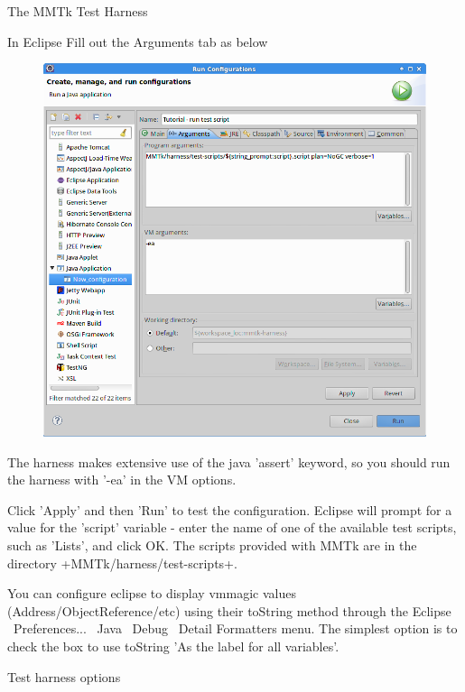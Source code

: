 \begin{chapter}{The MMTk Test Harness}
\begin{section}{In Eclipse}
Fill out the Arguments tab as below 

\begin{figure}[H]
  \centering
  \includegraphics[width=\textwidth]{images/TheMMTkTestHarness-ArgumentsTab.png}
\end{figure}

The harness makes extensive use of the java 'assert' keyword, so you should run the harness with '-ea' in the VM options.

Click 'Apply' and then 'Run' to test the configuration.  Eclipse will prompt for a value for the 'script' variable - enter the name of one of the available test scripts, such as 'Lists', and click OK.  The scripts provided with MMTk are in the directory \spverb+MMTk/harness/test-scripts+.

You can configure eclipse to display vmmagic values (Address/ObjectReference/etc) using their toString method through the Eclipse \textrightarrow\ Preferences... \textrightarrow\ Java \textrightarrow\ Debug \textrightarrow\ Detail Formatters menu. The simplest option is to check the box to use toString 'As the label for all variables'.

\end{section}

\begin{section}{Test harness options}


\end{section}
\end{chapter}
